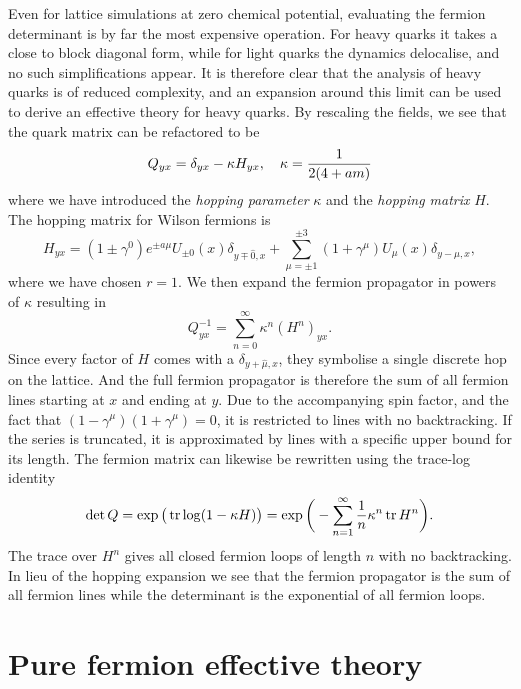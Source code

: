 Even for lattice simulations at zero chemical potential, evaluating the fermion
determinant is by far the most expensive operation. For heavy quarks it takes a
close to block diagonal form, while for light quarks the dynamics delocalise,
and no such simplifications appear. It is therefore clear that the analysis of
heavy quarks is of reduced complexity, and an expansion around this limit can be
used to derive an effective theory for heavy quarks. By rescaling the fields, we
see that the quark matrix can be refactored to be
%
\begin{equation}
  Q_{yx} = \delta_{yx} - \kappa H_{yx}, \hskip1em \kappa = \frac{1}{2(4 + am)}
\end{equation}
%
where we have introduced the \emph{hopping parameter} $\kappa$ and the
\emph{hopping matrix} $H$. The hopping matrix for Wilson fermions is
%
\begin{equation}
  H_{yx} = (1 \pm \gamma^0) e^{\pm a\mu} U_{\pm 0}(x) \delta_{y \mp \hat{0},x}
    + \sum_{\mu = \pm 1}^{\pm 3} (1 + \gamma^{\mu}) U_{\mu}(x) \delta_{y-\hat{\mu},x},
\end{equation}
%
where we have chosen $r=1$. We then expand the fermion propagator in powers of
$\kappa$ resulting in
%
\begin{equation}
  Q^{-1}_{yx} = \sum_{n=0}^{\infty} \kappa^n (H^n)_{yx} .
\end{equation}
%
Since every factor of $H$ comes with a $\delta_{y+\hat{\mu},x}$, they symbolise
a single discrete hop on the lattice. And the full fermion propagator is
therefore the sum of all fermion lines starting at $x$ and ending at $y$. Due to
the accompanying spin factor, and the fact that $(1 - \gamma^{\mu}) (1 +
\gamma^{\mu}) = 0$, it is restricted to lines with no backtracking.  If the
series is truncated, it is approximated by lines with a specific upper bound for
its length. The fermion matrix can likewise be rewritten using the trace-log
identity
%
\begin{equation}
  \det Q = \exp \big(\operatorname{tr} \log (1 - \kappa H) \big) = \exp \bigg( -\sum_{n=1}^{\infty} \frac{1}{n}
  \kappa^n \operatorname{tr} H^n \bigg).
\end{equation}
%
The trace over $H^n$ gives all closed fermion loops of length $n$ with no
backtracking. In lieu of the hopping expansion we see that the fermion
propagator is the sum of all fermion lines while the determinant is the
exponential of all fermion loops.

\section{Pure fermion effective theory} \label{sec-pure-fermion-eff-theory}

